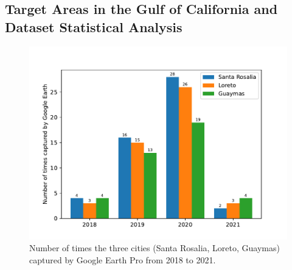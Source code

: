 \subsection{Target Areas in the Gulf of California and Dataset Statistical Analysis}
\begin{figure}[t]
    \center
    \includegraphics[width=\columnwidth]{img/NumberOfTimesCapturedByGEP.pdf}
    \caption{Number of times the three cities (Santa Rosalia, Loreto, Guaymas) captured by Google Earth Pro from 2018 to 2021.}
    \label{NumberOfTimesCapturedByGEP}
\end{figure}

